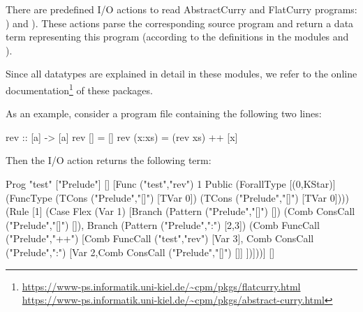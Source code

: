 {There are predefined I/O actions to read AbstractCurry and
FlatCurry programs: )
and ).
These actions parse the corresponding source program and return
a data term representing this program (according to the definitions
in the modules  and ).

Since all datatypes are explained in detail in these modules,
we refer to the online documentation\footnote{%
\url{https://www-ps.informatik.uni-kiel.de/~cpm/pkgs/flatcurry.html}\\
\url{https://www-ps.informatik.uni-kiel.de/~cpm/pkgs/abstract-curry.html}}
of these packages.

As an example, consider a program file 
containing the following two lines:
\begin{curry}
rev :: [a] -> [a]
rev []     = []
rev (x:xs) = (rev xs) ++ [x]
\end{curry}
Then the I/O action  returns the
following term:
\begin{curry}
Prog "test"
  ["Prelude"]
  []
  [Func ("test","rev") 1 Public
    (ForallType [(0,KStar)] (FuncType (TCons ("Prelude","[]") [TVar 0])
                                      (TCons ("Prelude","[]") [TVar 0])))
    (Rule [1]
       (Case Flex (Var 1)
          [Branch (Pattern ("Prelude","[]") [])
             (Comb ConsCall ("Prelude","[]") []),
           Branch (Pattern ("Prelude",":") [2,3])
             (Comb FuncCall ("Prelude","++")
                   [Comb FuncCall ("test","rev") [Var 3],
                    Comb ConsCall ("Prelude",":")
                         [Var 2,Comb ConsCall ("Prelude","[]") []]
                   ])]))]
  []
\end{curry}


\newpage


}

